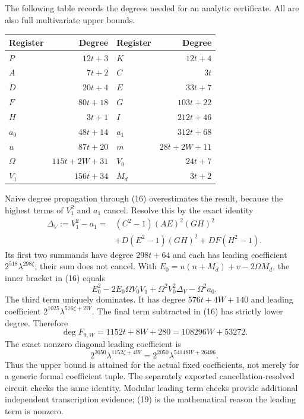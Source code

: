 \documentclass[11pt]{article}
\theoremstyle{definition}\newtheorem{definition}[theorem]{Definition}
\begin{document}
The following table records the degrees needed for an analytic
certificate. All are also full multivariate upper bounds.
\begin{center}\small
\begin{tabular}{@{}lr@{\qquad}lr@{}}
\toprule
Register & Degree & Register & Degree\\
\midrule
$P$ & $12t+3$ & $K$ & $12t+4$\\
$A$ & $7t+2$ & $C$ & $3t$\\
$D$ & $20t+4$ & $E$ & $33t+7$\\
$F$ & $80t+18$ & $G$ & $103t+22$\\
$H$ & $3t+1$ & $I$ & $212t+46$\\
$a_0$ & $48t+14$ & $a_1$ & $312t+68$\\
$u$ & $87t+20$ & $m$ & $28t+2W+11$\\
$\Omega$ & $115t+2W+31$ & $V_0$ & $24t+7$\\
$V_1$ & $156t+34$ & $M_d$ & $3t+2$\\
\bottomrule
\end{tabular}
\end{center}

Naive degree propagation through (16) overestimates the result, because
the highest terms of $V_1^2$ and $a_1$ cancel. Resolve this by the exact
identity
\begin{align*}
\Delta_V:=V_1^2-a_1={}&(C^2-1)(AE)^2(GH)^2\\
 &+D(E^2-1)(GH)^2+DF(H^2-1).
\end{align*}
Its first two summands have degree $298t+64$ and each has leading
coefficient $2^{518}\lambda^{298\zeta}$; their sum does not cancel.
With $E_0=u(n+M_d)+v-2\Omega M_d$, the inner bracket in (16) equals
\[
 E_0^2-2E_0\Omega V_0V_1+\Omega^2V_0^2\Delta_V-\Omega^2a_0.
\]
The third term uniquely dominates. It has degree
$576t+4W+140$ and leading coefficient
$2^{1025}\lambda^{576\zeta+2W}$.
The final term subtracted in (16) has strictly lower degree.
Therefore
\[
 \boxed{\deg F_{9,W}=1152t+8W+280=108296W+53272.}       \tag{18}
\]
The exact nonzero diagonal leading coefficient is
\[
 2^{2050}\lambda^{1152\zeta+4W}
 =2^{2050}\lambda^{54148W+26496}.                      \tag{19}
\]
Thus the upper bound is attained for the actual fixed coefficients, not
merely for a generic formal coefficient tuple. The separately exported
cancellation-resolved circuit checks the same identity. Modular leading
term checks provide additional independent transcription evidence; (19)
is the mathematical reason the leading term is nonzero.
\end{document}

